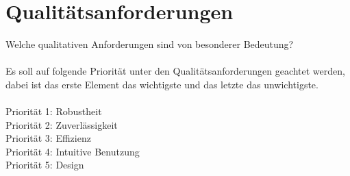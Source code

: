 \chapter{Qualitätsanforderungen}
Welche qualitativen Anforderungen sind von besonderer Bedeutung?\ \\ \\
Es soll auf folgende Priorität unter den Qualitätsanforderungen geachtet werden, dabei ist das erste Element das wichtigste und das letzte das unwichtigste.\ \\ \\
Priorität 1: Robustheit\ \\
Priorität 2: Zuverlässigkeit\ \\
Priorität 3: Effizienz\ \\
Priorität 4: Intuitive Benutzung\ \\
Priorität 5: Design\ \\ \\
